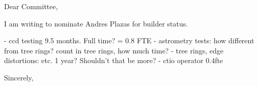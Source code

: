 \documentclass[12pt]{letter}
\begin{document}
\begin{letter}{}

\opening{Dear Committee,}

I am writing to nominate Andres Plazas for builder status.   

- ccd testing 9.5 months.  Full time? = 0.8 FTE
- astrometry tests: how different from tree rings?  count in tree rings, how much time?
- tree rings, edge distortions: etc. 1 year?  Shouldn't that be more?
- ctio operator 0.4fte

\closing{Sincerely, }

\end{letter}
\end{document}
